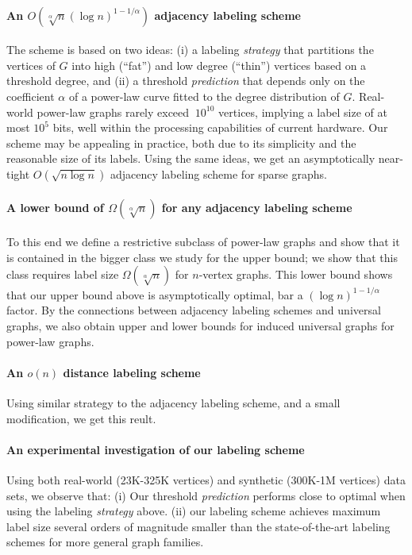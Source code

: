 \paragraph{An  $O(\sqrt[\alpha] n (\log n)^{1 - 1/\alpha})$ adjacency labeling scheme}
The scheme is based on two ideas:
(i) a labeling \emph{strategy} that  partitions the vertices of $G$ into high (``fat'') and low degree (``thin'') vertices based on a threshold degree, and (ii) a threshold \emph{prediction} that depends only on the coefficient $\alpha$ of a power-law curve fitted to the degree distribution of $G$. 
Real-world power-law graphs rarely exceed  $~10^{10}$ vertices, implying a label size of at most  ${10^{5}}$ bits, well within the processing capabilities of current hardware. 
Our  scheme may be appealing in practice,  both due  to its simplicity and the reasonable size of its labels.
Using the same ideas, we get an  asymptotically near-tight  $O(\sqrt{n \log n})$ adjacency labeling scheme for sparse graphs.

\paragraph{A lower bound of $\Omega(\sqrt[\alpha]{n})$ for any adjacency labeling scheme}
To this end we define a  restrictive subclass of power-law graphs and show that it is contained in the bigger class we study for the upper bound; we show that this class requires label size $\Omega(\sqrt[\alpha]{n})$ for $n$-vertex graphs.
This lower bound shows that our upper bound above is asymptotically  optimal, bar a $(\log n)^{1 - 1/\alpha}$ factor.
By the connections between adjacency labeling schemes and universal graphs, we also obtain upper and lower bounds for induced universal graphs for power-law graphs. 

\paragraph{An $o(n)$ distance labeling scheme}
Using similar strategy to the adjacency labeling scheme, and a small modification, we get this reult.


\paragraph{An experimental investigation  of our labeling scheme}
Using both real-world (23K-325K vertices) and synthetic (300K-1M vertices) data sets, we observe that:
(i) Our threshold \emph{prediction} performs close to optimal when using the labeling \emph{strategy} above. 
(ii) our labeling scheme achieves maximum label size several orders of magnitude smaller than the state-of-the-art labeling schemes for more general graph families.

